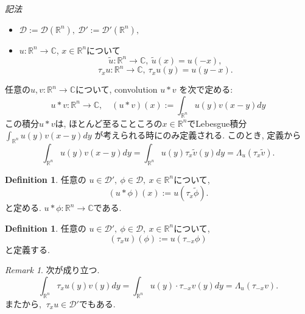 \documentclass[dvipdfmx,a4paper,11pt]{article} %
\theoremstyle{definition}
\newtheorem{defn}[thm]{Definition}
\theoremstyle{remark}
\newtheorem{rem}[thm]{Remark}
\numberwithin{equation}{section}
\newcommand{\R}{\mathbb{R}}
\newcommand{\C}{\mathbb{C}}
\begin{document}
\textit{記法}

\begin{itemize}
\item \(\mathcal{D} := \mathcal{D}(\mathbb{R}^n), \ \mathcal{D}' := \mathcal{D}'(\mathbb{R}^n),\)
\item  \(u : \mathbb{R}^n \to \mathbb{C}\),  \(x \in \mathbb{R}^n\)について
\[ \widetilde{u} : \mathbb{R}^n \to \mathbb{C}, \ \widetilde{u}(x) = u(-x),\]
\[ \tau_x u : \mathbb{R}^n \to \mathbb{C}, \ \tau_x u(y) = u(y-x).\]
\end{itemize}
任意の\( u,v : \mathbb{R}^n \to \mathbb{C}\)について, convolution \(u \ast v\) を次で定める:
\[
u \ast v : \mathbb{R}^n \to \mathbb{C}, \quad (u \ast v)(x) := \int_{\mathbb{R}^n} u(y) v(x-y) dy
\]
この積分$u \ast v$は, ほとんど至ることころの$x \in \R^n$でLebesgue積分\(\int_{\mathbb{R}^n} u(y)v(x-y)dy\)
が考えられる時にのみ定義される.
このとき, 定義から
\[
\int_{\mathbb{R}^n} u(y) v(x-y) dy 
= \int_{\mathbb{R}^n} u(y) \tau_x \widetilde{v}(y) dy 
= \Lambda_u(\tau_x \widetilde{v}).
\]


\begin{tcolorbox}[mybox]
\begin{defn}%
\label{defn-H-2.7}
任意の \(u \in \mathcal{D}', \ \phi \in \mathcal{D}, \ x \in \mathbb{R}^n\)について, 
\[
(u \ast \phi)(x) := u(\tau_x \widetilde{\phi}).
\]
と定める. $u \ast \phi : \R^n \to \C$である. 
\end{defn}
\end{tcolorbox}


\begin{tcolorbox}[mybox]
\begin{defn}%
\label{defn-H-2.8}
任意の \(u \in \mathcal{D}', \ \phi \in \mathcal{D}, \ x \in \mathbb{R}^n\)について, 
\[
(\tau_x u)(\phi) := u(\tau_{-x} \phi)
\]
と定義する. 
\end{defn}
\end{tcolorbox}

\begin{rem}
次が成り立つ. 
\[
\int_{\mathbb{R}^n} \tau_x u(y) v(y) dy 
= \int_{\mathbb{R}^n} u(y) \cdot \tau_{-x} v(y) dy
= \Lambda_u(\tau_{-x} v).
\]
また\cite[Theorem 6.8]{Rud}から, \(\ \tau_x u \in \mathcal{D}' \)でもある. 
\end{rem}
\end{document}
